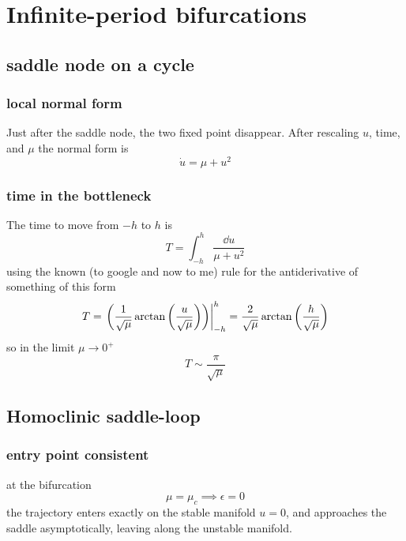 \clearpage
\section{Infinite-period bifurcations}
\subsection{saddle node on a cycle}
\subsubsection{local normal form}
Just after the saddle node, the two fixed point disappear. After rescaling \(u\), time, and \(\mu\) the normal form is 
\begin{equation}
    \dot{u}=\mu+u^2
\end{equation}
\subsubsection{time in the bottleneck}
The time to move from \(-h\) to \(h\) is
\begin{equation}
    T = \int_{-h}^{h}\frac{\dd{u}}{\mu+u^2}
\end{equation}
using the known (to google and now to me) rule for the antiderivative of something of this form 
\begin{equation}
    T = \left.\left(\frac{1}{\sqrt{\mu}}\arctan\left(\frac{u}{\sqrt{\mu}}\right)\right)\right|_{-h}^h=\frac{2}{\sqrt{\mu}}\arctan\left(\frac{h}{\sqrt{\mu}}\right)
\end{equation}
so in the limit \(\mu\to0^+\)
\begin{equation}
    T \sim \frac{\pi}{\sqrt{\mu}}
\end{equation}
\subsection{Homoclinic saddle-loop}
\subsubsection{entry point consistent}
at the bifurcation 
\begin{equation}
    \mu=\mu_c \implies \epsilon=0
\end{equation}
the trajectory enters exactly on the stable manifold \(u=0\), and approaches the saddle asymptotically, leaving along the unstable manifold. 
